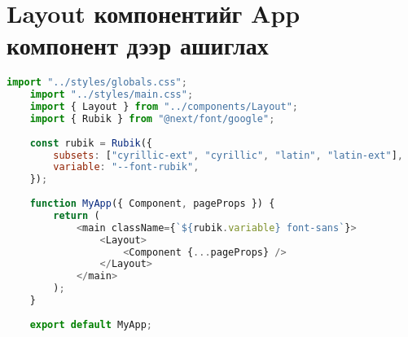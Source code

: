 \chapter{Layout компонентийг App компонент дээр ашиглах}
\label{appendix:layout-component}

\begin{lstlisting}[language=Javascript, frame=single]
	import "../styles/globals.css";
	import "../styles/main.css";
	import { Layout } from "../components/Layout";
	import { Rubik } from "@next/font/google";
	
	const rubik = Rubik({
		subsets: ["cyrillic-ext", "cyrillic", "latin", "latin-ext"],
		variable: "--font-rubik",
	});
	
	function MyApp({ Component, pageProps }) {
		return (
			<main className={`${rubik.variable} font-sans`}>
				<Layout>
					<Component {...pageProps} />
				</Layout>
			</main>
		);
	}
	
	export default MyApp;
	
\end{lstlisting}